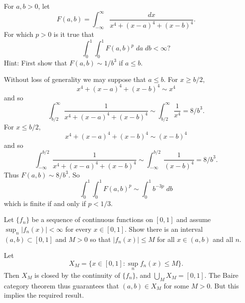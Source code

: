 \documentclass[answers]{exam}
\begin{document}
\begin{questions}

\question For $a,b > 0$, let
%
\[ F(a,b) = \int_{-\infty}^\infty \frac{dx}{x^4 + (x - a)^4 + (x - b)^4}. \]
%
For which $p > 0$ is it true that
%
\[ \int_0^1 \int_0^1 F(a,b)^p\; da\; db < \infty? \]
Hint: First show that $F(a,b) \sim 1/b^3$ if $a \leq b$.
\begin{solution}
	Without loss of generality we may suppose that $a \leq b$. For $x \geq b/2$,
	\[ x^4 + (x - a)^4 + (x - b)^4 \sim x^4 \]
	and so
	\[ \int_{b/2}^\infty \frac{1}{x^4 + (x - a)^4 + (x - b)^4} \sim \int_{b/2}^\infty \frac{1}{x^4} = 8/b^3. \]
	For $x \leq b/2$,
	\[ x^4 + (x - a)^4 + (x - b)^4 \sim (x - b)^4 \]
	and so
	\[ \int_{-\infty}^{b/2} \frac{1}{x^4 + (x - a)^4 + (x - b)^4} \sim \int_{-\infty}^{b/2} \frac{1}{(x - b)^4} = 8/b^3. \]
	Thus $F(a,b) \sim 8/b^3$. So
	\[ \int_0^1 \int_0^1 F(a,b)^p \sim \int_0^1 b^{-3p}\; db \]
	which is finite if and only if $p < 1/3$.
\end{solution}

\question Let $\{ f_n \}$ be a sequence of continuous functions on $[0,1]$ and assume $\sup_n |f_n(x)| < \infty$ for every $x \in [0,1]$. Show there is an interval $(a,b) \subset [0,1]$ and $M > 0$ so that $|f_n(x)| \leq M$ for all $x \in (a,b)$ and all $n$.
\begin{solution}
	Let
	\[ X_M = \{ x \in [0,1]: \sup_n f_n(x) \leq M \}. \]
	Then $X_M$ is closed by the continuity of $\{ f_n \}$, and $\bigcup_M X_M = [0,1]$. The Baire category theorem thus guarantees that $(a,b) \in X_M$ for some $M > 0$. But this implies the required result.
\end{solution}


\end{questions}
\end{document}
